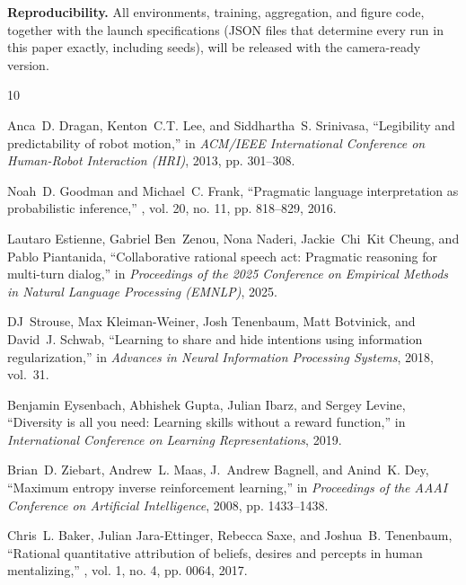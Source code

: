 \documentclass{article}
\begin{document}
\textbf{Reproducibility.} All environments, training, aggregation, and figure code, together with the launch specifications (JSON files that determine every run in this paper exactly, including seeds), will be released with the camera-ready version.



\begin{thebibliography}{10}

Anca~D. Dragan, Kenton~C.T. Lee, and Siddhartha~S. Srinivasa,
\newblock ``Legibility and predictability of robot motion,''
\newblock in {\em ACM/IEEE International Conference on Human-Robot Interaction (HRI)}, 2013, pp. 301--308.

Noah~D. Goodman and Michael~C. Frank,
\newblock ``Pragmatic language interpretation as probabilistic inference,''
, vol. 20, no. 11, pp. 818--829, 2016.

Lautaro Estienne, Gabriel Ben~Zenou, Nona Naderi, Jackie~Chi~Kit Cheung, and Pablo Piantanida,
\newblock ``Collaborative rational speech act: Pragmatic reasoning for multi-turn dialog,''
\newblock in {\em Proceedings of the 2025 Conference on Empirical Methods in Natural Language Processing (EMNLP)}, 2025.

DJ~Strouse, Max Kleiman-Weiner, Josh Tenenbaum, Matt Botvinick, and David~J. Schwab,
\newblock ``Learning to share and hide intentions using information regularization,''
\newblock in {\em Advances in Neural Information Processing Systems}, 2018, vol.~31.

Benjamin Eysenbach, Abhishek Gupta, Julian Ibarz, and Sergey Levine,
\newblock ``Diversity is all you need: Learning skills without a reward function,''
\newblock in {\em International Conference on Learning Representations}, 2019.

Brian~D. Ziebart, Andrew~L. Maas, J.~Andrew Bagnell, and Anind~K. Dey,
\newblock ``Maximum entropy inverse reinforcement learning,''
\newblock in {\em Proceedings of the AAAI Conference on Artificial Intelligence}, 2008, pp. 1433--1438.

Chris~L. Baker, Julian Jara-Ettinger, Rebecca Saxe, and Joshua~B. Tenenbaum,
\newblock ``Rational quantitative attribution of beliefs, desires and percepts in human mentalizing,''
, vol. 1, no. 4, pp. 0064, 2017.


\end{thebibliography}
\end{document}
